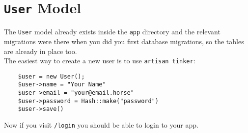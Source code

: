 \section{\texttt{User} Model}

The \texttt{User} model already exists inside the \texttt{app} directory and the relevant migrations were there when you did you first database migrations, so the tables are already in place too.
\\

The easiest way to create a new user is to use \texttt{artisan tinker}:

\begin{verbatim}
    $user = new User();
    $user->name = "Your Name"
    $user->email = "your@email.horse"
    $user->password = Hash::make("password")
    $user->save()
\end{verbatim}

Now if you visit \texttt{/login} you should be able to login to your app.

\pagebreak


